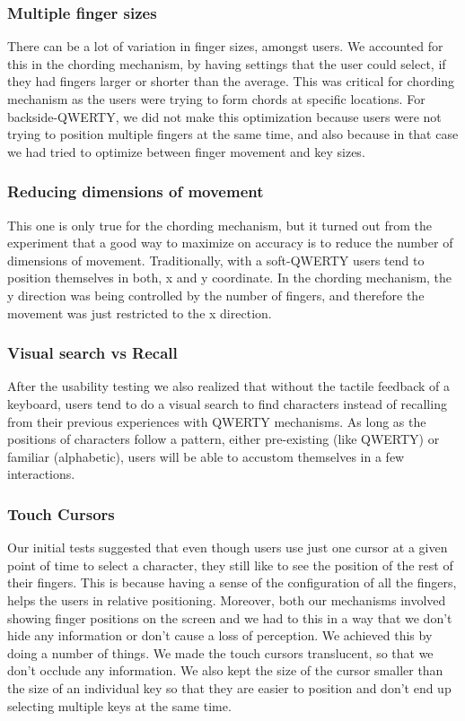 \subsubsection{Multiple finger sizes}

There can be a lot of variation in finger sizes, amongst users. We accounted for this in the chording mechanism, by having settings that the user could select, if they had fingers larger or shorter than the average. This was critical for chording mechanism as the users were trying to form chords at specific locations. For backside-QWERTY, we did not make this optimization because users were not trying to position multiple fingers at the same time, and also because in that case we had tried to optimize between finger movement and key sizes.

\subsubsection{Reducing dimensions of movement}

This one is only true for the chording mechanism, but it turned out from the experiment that a good way to maximize on accuracy is to reduce the number of dimensions of movement. Traditionally, with a soft-QWERTY users tend to position themselves in both, x and y coordinate. In the chording mechanism, the y direction was being controlled by the number of fingers, and therefore the movement was just restricted to the x direction.

\subsubsection{Visual search vs Recall}

After the usability testing we also realized that without the tactile feedback of a keyboard, users tend to do a visual search to find characters instead of recalling from their previous experiences with QWERTY mechanisms. As long as the positions of characters follow a pattern, either pre-existing (like QWERTY) or familiar (alphabetic), users will be able to accustom themselves in a few interactions.

\subsubsection{Touch Cursors}
Our initial tests suggested that even though users use just one cursor at a given point of time to select a character, they still like to see the position of the rest of their fingers. This is because having a sense of the configuration of all the fingers, helps the users in relative positioning. Moreover, both our mechanisms involved showing finger positions on the screen and we had to this in a way that we don't hide any information or don't cause a loss of perception. We achieved this by doing a number of things. We made the touch cursors translucent, so that we don't occlude any information. We also kept the size of the cursor smaller than the size of an individual key so that they are easier to position and don't end up selecting multiple keys at the same time. 